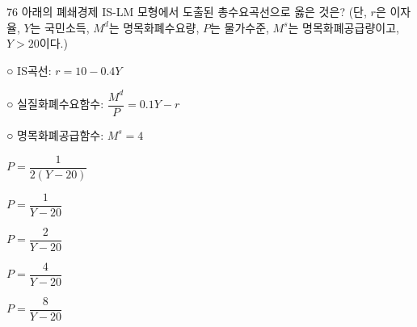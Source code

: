\begin{question}{76}
아래의 폐쇄경제 IS-LM 모형에서 도출된 총수요곡선으로 옳은 것은? (단, $r$은 이자율, $Y$는 국민소득, $M^d$는 명목화폐수요량, $P$는 물가수준, $M^s$는 명목화폐공급량이고, $Y>20$이다.)
\begin{framedtext}
○ IS곡선: $r = 10 - 0.4Y$ \par
○ 실질화폐수요함수: $\dfrac{M^d}{P} = 0.1Y - r$ \par
○ 명목화폐공급함수: $M^s = 4$
\end{framedtext}
\begin{choices}
  \item $P = \dfrac{1}{2(Y-20)}$
  \item $P = \dfrac{1}{Y-20}$
  \item $P = \dfrac{2}{Y-20}$
  \item $P = \dfrac{4}{Y-20}$
  \item $P = \dfrac{8}{Y-20}$
\end{choices}
\end{question}
